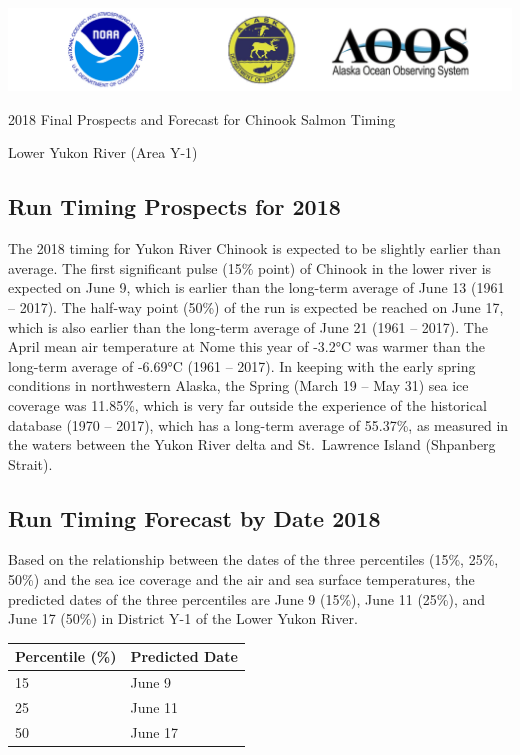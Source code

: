 \documentclass[]{article}
\title{}
\author{}
\date{}
\begin{document}
\includegraphics{images/combined.png}

\begin{center}
  \huge{2018 Final Prospects and Forecast for Chinook Salmon Timing}
  
  \large{Lower Yukon River (Area Y-1)}
\end{center}

\hypertarget{run-timing-prospects-for-2018}{%
\subsection{Run Timing Prospects for
2018}\label{run-timing-prospects-for-2018}}

The 2018 timing for Yukon River Chinook is expected to be slightly
earlier than average. The first significant pulse (15\% point) of
Chinook in the lower river is expected on June 9, which is earlier than
the long-term average of June 13 (1961 -- 2017). The half-way point
(50\%) of the run is expected be reached on June 17, which is also
earlier than the long-term average of June 21 (1961 -- 2017). The April
mean air temperature at Nome this year of -3.2°C was warmer than the
long-term average of -6.69°C (1961 -- 2017). In keeping with the early
spring conditions in northwestern Alaska, the Spring (March 19 -- May
31) sea ice coverage was 11.85\%, which is very far outside the
experience of the historical database (1970 -- 2017), which has a
long-term average of 55.37\%, as measured in the waters between the
Yukon River delta and St.~Lawrence Island (Shpanberg Strait).

\hypertarget{run-timing-forecast-by-date-2018}{%
\subsection{Run Timing Forecast by Date
2018}\label{run-timing-forecast-by-date-2018}}

Based on the relationship between the dates of the three percentiles
(15\%, 25\%, 50\%) and the sea ice coverage and the air and sea surface
temperatures, the predicted dates of the three percentiles are June 9
(15\%), June 11 (25\%), and June 17 (50\%) in District Y-1 of the Lower
Yukon River.

\begin{longtable}[]{@{}ll@{}}
\toprule
Percentile (\%) & Predicted Date\tabularnewline
\midrule
\endhead
15 & June 9\tabularnewline
25 & June 11\tabularnewline
50 & June 17\tabularnewline
\bottomrule
\end{longtable}
\end{document}
